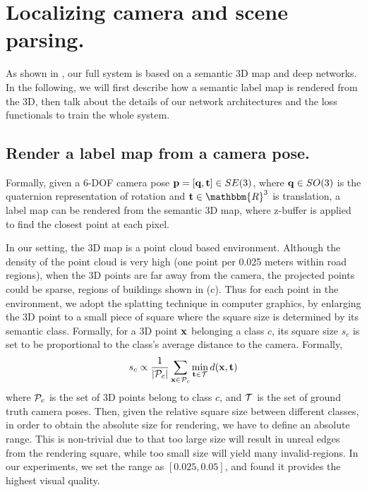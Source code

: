 \section{Localizing camera and scene parsing.}
\label{sec:localize_and_parsing}
As shown in , our full system is based on a semantic 3D map and deep networks. In the following, we will first describe how a semantic label map is rendered from the 3D, then talk about the details of our network architectures and the loss functionals to train the whole system.

\subsection{Render a label map from a camera pose.}
\label{sub:render}
Formally, given a 6-DOF camera pose ${\mathbf p} = [{\mathbf q}, {\mathbf t}] \in SE(3)$, where ${\mathbf q} \in SO(3)$ is the quaternion representation of rotation and $\ve{t} \in \mathbbm{R}^3$ is translation, a label map can be rendered from the semantic 3D map, where z-buffer is applied to find the closest point at each pixel.

In our setting, the 3D map is a point cloud based environment. Although the density of the point cloud is very high (one point per 0.025 meters within road regions), when the 3D points are far away from the camera, the projected points could be sparse, \eg regions of buildings shown in (c).
Thus for each point in the environment, we adopt the splatting technique in computer graphics, by enlarging the 3D point to a small piece of square where the square size is determined by its semantic class. Formally, for a 3D point ${\mathbf x}$ belonging a class $c$, its square size $s_c$ is set to be proportional to the class's average distance to the camera. Formally,
\begin{align}
\label{eq:square_size}
s_c \propto \frac{1}{|{\mathcal P}_c|}\sum_{{\mathbf x}\in {\mathcal P}_c} \min_{{\mathbf t}\in{\mathcal T}} d({\mathbf x}, {\mathbf t})
\end{align}
where ${\mathcal P}_c$ is the set of 3D points belong to class $c$, and ${\mathcal T}$ is the set of ground truth camera poses. Then, given the relative square size between different classes, in order to obtain the absolute size for rendering, we have to define an absolute range. This is non-trivial due to that too large size will result in unreal edges from the rendering square, while too small size will yield many invalid-regions. In our experiments, we set the range as $[0.025, 0.05]$, and found it provides the highest visual quality. 

